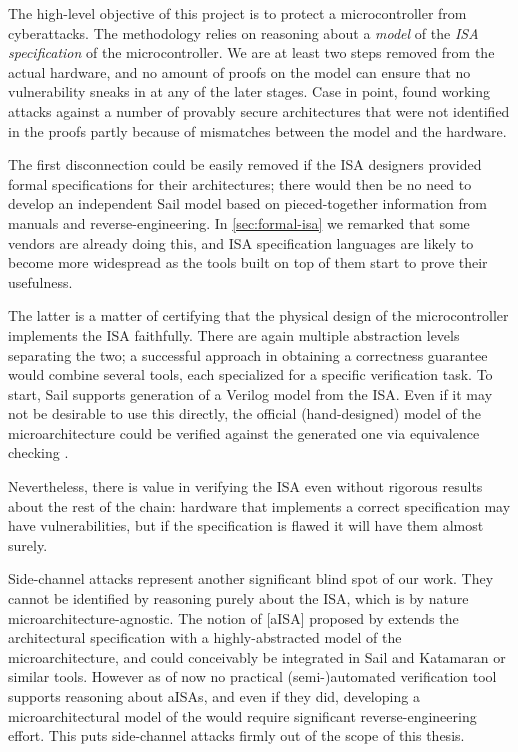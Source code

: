 The high-level objective of this project is to protect a microcontroller from cyberattacks. The methodology relies on reasoning about a \emph{model} of the \emph{ISA specification} of the microcontroller. We are at least two steps removed from the actual hardware, and no amount of proofs on the model can ensure that no vulnerability sneaks in at any of the later stages. Case in point, \cite{Bognar2022} found working attacks against a number of provably secure architectures that were not identified in the proofs partly because of mismatches between the model and the hardware.

The first disconnection could be easily removed if the ISA designers provided formal specifications for their architectures; there would then be no need to develop an independent Sail model based on pieced-together information from manuals and reverse-engineering. In \cref{sec:formal-isa} we remarked that some vendors are already doing this, and ISA specification languages are likely to become more widespread as the tools built on top of them start to prove their usefulness.

The latter is a matter of certifying that the physical design of the microcontroller implements the ISA faithfully. There are again multiple abstraction levels separating the two; a successful approach in obtaining a correctness guarantee would combine several tools, each specialized for a specific verification task. To start, Sail supports generation of a Verilog model from the ISA. Even if it may not be desirable to use this directly, the official (hand-designed) model of the microarchitecture could be verified against the generated one via equivalence checking \cite{Reid2016a}.

Nevertheless, there is value in verifying the ISA even without rigorous results about the rest of the chain: hardware that implements a correct specification may have vulnerabilities,
but if the specification is flawed it will have them almost surely.

Side-channel attacks represent another significant blind spot of our work. They cannot be identified by reasoning purely about the ISA, which is by nature micro\-ar\-chi\-tec\-ture-agnostic. The notion of [aISA] proposed by \cite{Ge2018} extends the architectural specification with a highly-abstracted model of the microarchitecture, and could conceivably be integrated in Sail and Katamaran or similar tools. However as of now no practical (semi-)automated verification tool supports reasoning about aISAs, and even if they did, developing a microarchitectural model of the \msp would require significant reverse-engineering effort. This puts side-channel attacks firmly out of the scope of this thesis.

